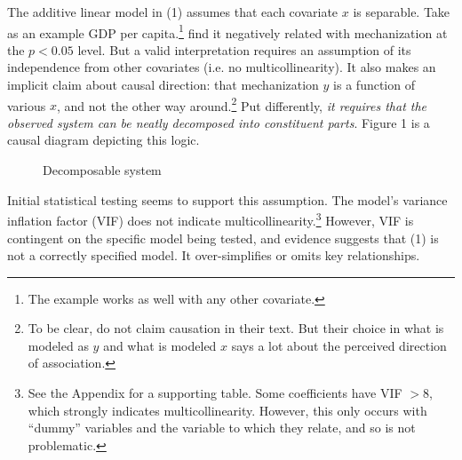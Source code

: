\documentclass{article}
\begin{document}
The additive linear model in (1) assumes that each covariate $x$ is separable. Take as an example 
GDP per capita.\footnote{The example works as well with any
other covariate.} \citet{sechser2010army} find it negatively related with mechanization at the $p < 0.05$ level. 
But a valid interpretation requires an assumption
of its independence from other covariates (i.e. no multicollinearity).
It also makes an implicit claim about causal direction: that
mechanization $y$ is a function of various
$x$, and not the other way around.\footnote{To be clear,
\citet{sechser2010army} do not claim causation in their text. But
their choice in what is modeled as $y$ and what is modeled $x$ says a lot about the perceived
direction of association.} Put differently, \textit{it requires that the
observed system can be neatly 
decomposed into constituent parts}. Figure 1 is a causal diagram depicting this logic. 
\begin{figure}[h!]
	\centering
	\caption{Decomposable system}
\end{figure}

Initial statistical testing seems to support this assumption. The model's variance
inflation factor (VIF) does not indicate multicollinearity.\footnote{See the Appendix for
a supporting table. Some coefficients have VIF $> 8$, which strongly
indicates multicollinearity. However, this only occurs with ``dummy'' variables
and the variable to which they relate, and so is not problematic.} However, VIF
is contingent on the specific model being tested, and evidence suggests that 
(1) is not a correctly specified model. It over-simplifies or omits key
relationships.
\end{document}
